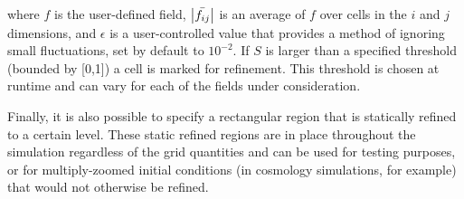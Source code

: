 \begin{enumerate}
  where $f$ is the user-defined field, $\left|\bar{f_{ij}}\right|$ is an average of
  $f$ over cells in the $i$ and $j$ dimensions, and $\epsilon$ is
  a user-controlled value that provides a method of ignoring small
  fluctuations, set by default to $10^{-2}$.  If $S$ is larger than a specified
  threshold (bounded by [0,1]) a cell is marked for refinement. This threshold
  is chosen at runtime and can vary for each of the fields under consideration.

\end{enumerate}

Finally, it is also possible to specify a rectangular region that is statically refined to a certain level.  These static refined regions are in place throughout the simulation regardless of the grid quantities and can be used for testing purposes, or for multiply-zoomed initial conditions (in cosmology simulations, for example) that would not otherwise be refined.

%


